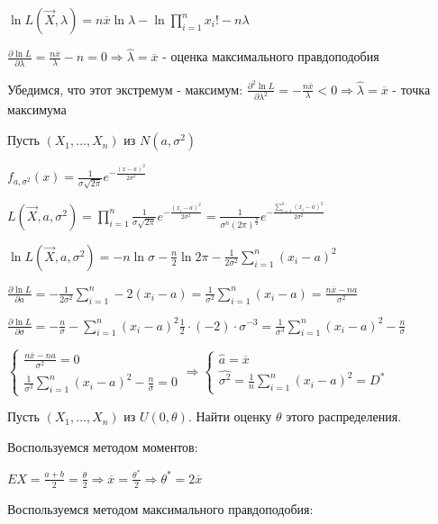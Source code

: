 \documentclass[12pt]{article}
\begin{document}
$\ln L(\vec{X}, \lambda) = n \overline{x} \ln \lambda - \ln \prod_{i = 1}^n x_i! - n\lambda$

$\frac{\partial \ln L}{\partial \lambda} = \frac{n \overline{x}}{\lambda} - n = 0 \Longrightarrow \hat{\lambda} = \overline{x}$ - оценка максимального правдоподобия

Убедимся, что этот экстремум - максимум: $\frac{\partial^2 \ln L}{\partial \lambda^2} = -\frac{n \overline{x}}{\lambda} < 0 \Longrightarrow \hat{\lambda} = \overline{x}$ - точка максимума

 Пусть $(X_1, \dots, X_n)$ из $N(a, \sigma^2)$

$f_{a, \sigma^2} (x) = \frac{1}{\sigma \sqrt{2\pi}} e^{-\frac{(x - a)^2}{2\sigma^2}}$

$L(\vec{X}, a, \sigma^2) = \prod_{i = 1}^n \frac{1}{\sigma \sqrt{2\pi}} e^{-\frac{(x_i - a)^2}{2\sigma^2}} = 
\frac{1}{\sigma^n (2\pi)^{\frac{n}{2}}} e^{-\frac{\sum_{i = 1}^n (x_i - a)^2}{2\sigma^2}}$

$\ln L(\vec{X}, a, \sigma^2) = -n\ln \sigma - \frac{n}{2} \ln 2\pi - \frac{1}{2\sigma^2}\sum_{i = 1}^n (x_i - a)^2$

$\frac{\partial \ln L}{\partial a} = -\frac{1}{2\sigma^2} \sum_{i = 1}^n -2(x_i - a) = \frac{1}{\sigma^2} \sum_{i = 1}^n (x_i - a) = \frac{n\overline{x} - na}{\sigma^2}$

$\frac{\partial \ln L}{\partial \sigma} = -\frac{n}{\sigma} - \sum_{i = 1}^n (x_i - a)^2 \frac{1}{2} \cdot (-2) \cdot \sigma^{-3} = \frac{1}{\sigma^3} \sum_{i = 1}^n (x_i - a)^2 - \frac{n}{\sigma}$

$\begin{cases}
    \frac{n\overline{x} - na}{\sigma^2} = 0 \\
    \frac{1}{\sigma^3} \sum_{i = 1}^n (x_i - a)^2 - \frac{n}{\sigma} = 0
\end{cases} \Longrightarrow \begin{cases}
    \hat{a} = \overline{x} \\
    \widehat{\sigma^2} = \frac{1}{n} \sum_{i = 1}^n (x_i - a)^2 = D^*
\end{cases} $

 Пусть $(X_1, \dots, X_n)$ из $U(0, \theta)$. Найти оценку $\theta$ этого распределения.

Воспользуемся методом моментов:

$EX = \frac{a + b}{2} = \frac{\theta}{2} \Longrightarrow \overline{x} = \frac{\theta^*}{2} \Longrightarrow \theta^* = 2\overline{x}$

Воспользуемся методом максимального правдоподобия:
\end{document}
